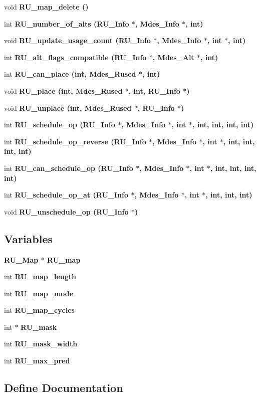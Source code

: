 \begin{CompactItemize}
void \bf{RU\_\-map\_\-delete} ()
\item 
int \bf{RU\_\-number\_\-of\_\-alts} (\bf{RU\_\-Info} $\ast$, Mdes\_\-Info $\ast$, int)
\item 
void \bf{RU\_\-update\_\-usage\_\-count} (\bf{RU\_\-Info} $\ast$, Mdes\_\-Info $\ast$, int $\ast$, int)
\item 
int \bf{RU\_\-alt\_\-flags\_\-compatible} (\bf{RU\_\-Info} $\ast$, Mdes\_\-Alt $\ast$, int)
\item 
int \bf{RU\_\-can\_\-place} (int, Mdes\_\-Rused $\ast$, int)
\item 
void \bf{RU\_\-place} (int, Mdes\_\-Rused $\ast$, int, \bf{RU\_\-Info} $\ast$)
\item 
void \bf{RU\_\-unplace} (int, Mdes\_\-Rused $\ast$, \bf{RU\_\-Info} $\ast$)
\item 
int \bf{RU\_\-schedule\_\-op} (\bf{RU\_\-Info} $\ast$, Mdes\_\-Info $\ast$, int $\ast$, int, int, int, int)
\item 
int \bf{RU\_\-schedule\_\-op\_\-reverse} (\bf{RU\_\-Info} $\ast$, Mdes\_\-Info $\ast$, int $\ast$, int, int, int, int)
\item 
int \bf{RU\_\-can\_\-schedule\_\-op} (\bf{RU\_\-Info} $\ast$, Mdes\_\-Info $\ast$, int $\ast$, int, int, int, int)
\item 
int \bf{RU\_\-schedule\_\-op\_\-at} (\bf{RU\_\-Info} $\ast$, Mdes\_\-Info $\ast$, int $\ast$, int, int, int)
\item 
void \bf{RU\_\-unschedule\_\-op} (\bf{RU\_\-Info} $\ast$)
\end{CompactItemize}
\subsection*{Variables}
\begin{CompactItemize}
\item 
\bf{RU\_\-Map} $\ast$ \bf{RU\_\-map}
\item 
int \bf{RU\_\-map\_\-length}
\item 
int \bf{RU\_\-map\_\-mode}
\item 
int \bf{RU\_\-map\_\-cycles}
\item 
int $\ast$ \bf{RU\_\-mask}
\item 
int \bf{RU\_\-mask\_\-width}
\item 
int \bf{RU\_\-max\_\-pred}
\end{CompactItemize}


\subsection{Define Documentation}

